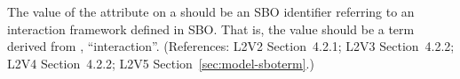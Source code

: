 The value of the  attribute on a \Model should be
an SBO identifier referring to an interaction framework defined
in SBO.  That is, the value should be a term derived from
\sbointeractionID, ``interaction''.  (References: L2V2
Section~4.2.1; L2V3 Section~4.2.2; L2V4 Section~4.2.2; L2V5 Section~\ref{sec:model-sboterm}.)
